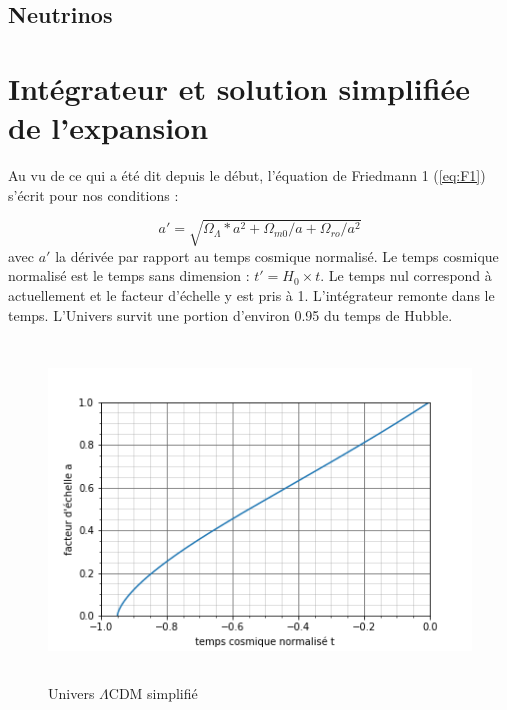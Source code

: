 \documentclass[10pt, a4paper]{report}
\numberwithin{equation}{subsection}
\begin{document}
\subsection{Neutrinos}


\section{Intégrateur et solution simplifiée de l'expansion}
Au vu de ce qui a été dit depuis le début, l'équation de Friedmann 1 (\ref{eq:F1}) s'écrit pour nos conditions :

\begin{equation} \label{eq:ELCDM}
\boxed{a' = \sqrt{\Omega_{\Lambda}*a^2+\Omega_{m0}/a+\Omega_{ro}/a^2}}
\end{equation}
avec $a'$ la dérivée par rapport au temps cosmique normalisé. Le temps cosmique normalisé est le temps sans dimension : $t' = H_0 \times t$.  Le temps nul correspond à actuellement et le facteur d'échelle y est pris à 1. L'intégrateur remonte dans le temps. L'Univers survit une portion d'environ 0.95 du temps de Hubble. 

\begin{figure}[h]
\centering
\includegraphics[width=12.0cm,height=9cm]{LCDMf.png}
\caption{Univers $\Lambda$CDM simplifié}
\label{fig:ULCDM}
\end{figure}
 
\end{document}
